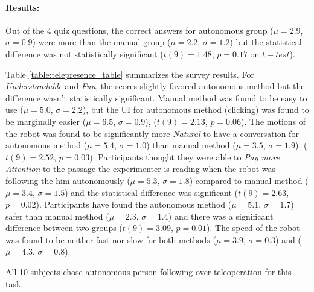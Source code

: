 \paragraph{Results:}

Out of the 4 quiz questions, the correct answers for autonomous group ($\mu=2.9$, $\sigma=0.9$) were more than the manual group ($\mu=2.2$, $\sigma=1.2$) but the statistical difference was not statistically significant ($t(9)=1.48$, $p=0.17$ on $t-test$).

Table \ref{table:telepresence_table} summarizes the survey results. For \emph{Understandable} and \emph{Fun}, the scores slightly favored autonomous method but the difference wasn't statistically significant. Manual method was found to be easy to use ($\mu=5.0$, $\sigma=2.2$), but the UI for autonomous method (clicking) was found to be marginally easier ($\mu=6.5$, $\sigma=0.9$), ($t(9)=2.13$, $p=0.06$). The motions of the robot was found to be significantly more \emph{Natural} to have a conversation for autonomous method ($\mu=5.4$, $\sigma=1.0$) than manual method ($\mu=3.5$, $\sigma=1.9$), ($t(9)=2.52$, $p=0.03$). Participants thought they were able to \emph{Pay more Attention} to the passage the experimenter is reading when the robot was following the him autonomously ($\mu=5.3$, $\sigma=1.8$) compared to manual method ($\mu=3.4$, $\sigma=1.5$) and the statistical difference was significant ($t(9)=2.63$, $p=0.02$). Participants have found the autonomous method ($\mu=5.1$, $\sigma=1.7$) safer than manual method ($\mu=2.3$, $\sigma=1.4$) and there was a significant difference between two groups ($t(9)=3.09$, $p=0.01$). The speed of the robot was found to be neither fast nor slow for both methods ($\mu=3.9$, $\sigma=0.3$) and ($\mu=4.3$, $\sigma=0.8$).

All 10 subjects chose autonomous person following over teleoperation for this task.


